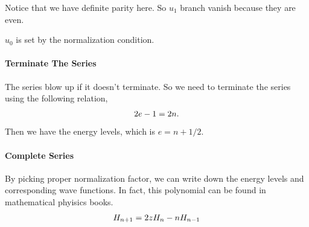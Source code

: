 \documentclass[letterpaper,10pt,english]{sphinxmanual}
\begin{document}
Notice that we have definite parity here. So \(u _ 1\) branch vanish because they are even.

\(u_0\) is set by the normalization condition.


\paragraph{Terminate The Series}
\label{Quantum/QuantumMechanics:terminate-the-series}
The series blow up if it doesn't terminate. So we need to terminate the series using the following relation,
\begin{gather}
\begin{split}2e - 1 = 2n .\end{split}\notag
\end{gather}
Then we have the energy levels, which is \(e=n+1/2\).


\paragraph{Complete Series}
\label{Quantum/QuantumMechanics:complete-series}
By picking proper normalization factor, we can write down the energy levels and corresponding wave functions. In fact, this polynomial can be found in mathematical phyisics books.
\begin{gather}
\begin{split}H _ {n+1} = 2 z H _n -n H _ {n-1}\end{split}\notag
\end{gather}
\end{document}
